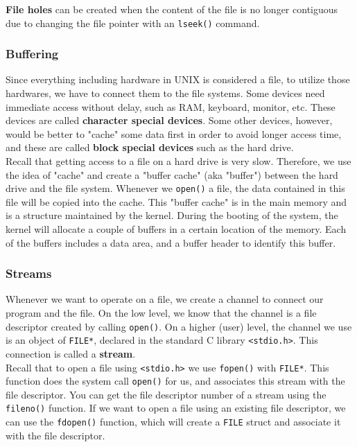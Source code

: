 \documentclass{article}
\newcommand{\bold}[1]{\textbf{#1}}
\newcommand{\code}[1]{\texttt{#1}}
\begin{document}
\bold{File holes} can be created when the content of the file is no longer contiguous due to changing the file pointer with an \code{lseek()} command. 

\subsubsection{Buffering}

Since everything including hardware in UNIX is considered a file, to utilize those hardwares, we have to connect them to the file systems. Some devices need immediate access without delay, such as RAM, keyboard, monitor, etc. These devices are called \bold{character special devices}. Some other devices, however, would be better to "cache" some data first in order to avoid longer access time, and these are called \bold{block special devices} such as the hard drive. \\

Recall that getting access to a file on a hard drive is very slow. Therefore, we use the idea of "cache" and create a "buffer cache" (aka "buffer") between the hard drive and the file system. Whenever we \code{open()} a file, the data contained in this file will be copied into the cache. This "buffer cache" is in the main memory and is a structure maintained by the kernel. During the booting of the system, the kernel will allocate a couple of buffers in a certain location of the memory. Each of the buffers includes a data area, and a buffer header to identify this buffer. 

\subsubsection{Streams}

Whenever we want to operate on a file, we create a channel to connect our program and the file. On the low level, we know that the channel is a file descriptor created by calling \code{open()}. On a higher (user) level, the channel we use is an object of \code{FILE*}, declared in the standard C library \code{<stdio.h>}. This connection is called a \bold{stream}. \\ 

Recall that to open a file using \code{<stdio.h>} we use \code{fopen()} with \code{FILE*}. This function does the system call \code{open()} for us, and associates this stream with the file descriptor. You can get the file descriptor number of a stream using the \code{fileno()} function. If we want to open a file using an existing file descriptor, we can use the \code{fdopen()} function, which will create a \code{FILE} struct and associate it with the file descriptor. 
\end{document}
